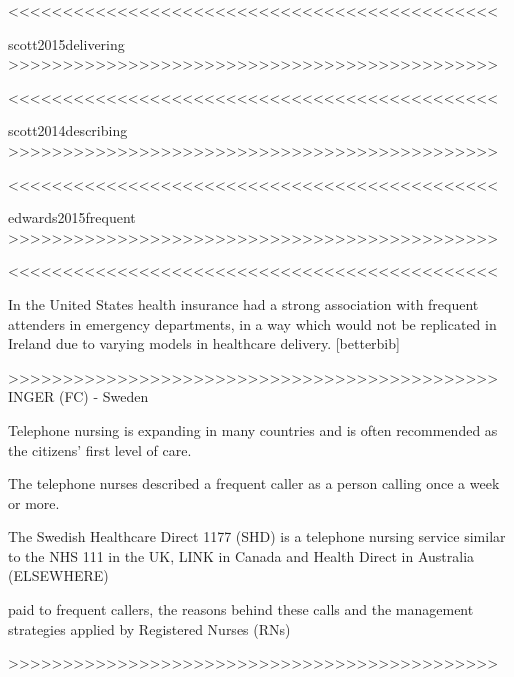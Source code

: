<<<<<<<<<<<<<<<<<<<<<<<<<<<<<<<<<<<<<<<<<<<<<


scott2015delivering
>>>>>>>>>>>>>>>>>>>>>>>>>>>>>>>>>>>>>>>>>>>>>



<<<<<<<<<<<<<<<<<<<<<<<<<<<<<<<<<<<<<<<<<<<<<


scott2014describing
>>>>>>>>>>>>>>>>>>>>>>>>>>>>>>>>>>>>>>>>>>>>>



<<<<<<<<<<<<<<<<<<<<<<<<<<<<<<<<<<<<<<<<<<<<<


edwards2015frequent
>>>>>>>>>>>>>>>>>>>>>>>>>>>>>>>>>>>>>>>>>>>>>



<<<<<<<<<<<<<<<<<<<<<<<<<<<<<<<<<<<<<<<<<<<<<




In the United States health insurance had a strong association with frequent attenders in emergency departments,\cite{lacalle2010frequent} in a way which would not be replicated in Ireland due to varying models in healthcare delivery.\cite{van2000equity} [betterbib] 












>>>>>>>>>>>>>>>>>>>>>>>>>>>>>>>>>>>>>>>>>>>>>
INGER \cite{holmstrom2017frequent}
(FC) - Sweden

Telephone nursing is expanding in many countries and is often recommended as the citizens’ first level of care.

The telephone nurses described a frequent caller as a person calling once a week or more.

The Swedish Healthcare Direct 1177 (SHD) is a telephone nursing service similar to the NHS 111 in the UK, LINK in Canada and Health Direct in Australia (ELSEWHERE)

paid to frequent callers, the reasons behind these calls and the management strategies applied by Registered Nurses (RNs)




>>>>>>>>>>>>>>>>>>>>>>>>>>>>>>>>>>>>>>>>>>>>>


